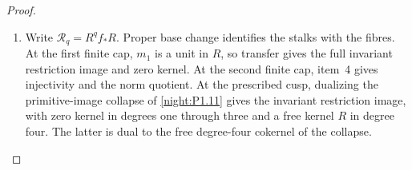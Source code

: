 \documentclass[11pt,a4paper]{article}
\numberwithin{equation}{section}
\theoremstyle{definition}
\begin{document}
\begin{proof}
\begin{enumerate}[label=\arabic*.]
of \cite[Lemma~7.25 and Propositions~7.26--7.27, pp.~61--63]{AC26}
and \cite[section ``The integral homology'']{E26}, with the
following explicitly computed coefficients.  Put
$L_q=\bigwedge^qR^6$, $A_q=\bigwedge^qA$, $B_q=\bigwedge^qB$.
The based-sphere complex for $j_*L_q$ is
\[
\begin{gathered}
 J_{1,q}\oplus J_{2,q}\oplus J_{0,q}
 \xrightarrow{d_0} L_q^2\xrightarrow{\Delta_q}L_q,\\
 J_{1,q}=\ker(A_q-I),\quad J_{2,q}=\ker(B_q-I),\quad
 J_{0,q}=\ker(B_qA_q-I),\\
 d_0(j_1,j_2,j_0)=(j_1-j_0,j_2-A_qj_0),\\
 \Delta_q(x,y)=(A_q-I)x+(B_q-I)y.
\end{gathered}
\]
The cusp paths carry $j_0$ and $A_qj_0$, so their combined
boundary is zero.  Inverse generator conventions give a chain
isomorphism: use cusp basis $A_qJ_{0,q}$ for the inverse pair,
and maps $-I$, $\operatorname{diag}(-A_q,-B_q)$, $I$ in degrees
zero, one and two.  Both chain identities follow by multiplication.

Unimodular HNF transformations give primitive invariant bases
and kernel coordinates for $d_0$ in $\ker\Delta_q$.  In both cases
the exact Smith records are
\[
\begin{array}{c|ccc|c|c}
q&\operatorname{rank}H^0&\operatorname{rank}H^1&\operatorname{rank}H^2
 &\operatorname{SNF}(d_0\text{ in }\ker\Delta_q)
 &\operatorname{SNF}(\Delta_q)\\\hline
1&1&0&0&1^6&1^5,2\\
2&0&0&0&1^{15}&1^{14},2\\
3&0&3&0&1^{17}&1^{19},2\\
4&0&0&0&1^{15}&1^{14},2
\end{array}
\]
All displayed groups are therefore free over $R$.

\item Write $\mathcal R_q=R^qf_*R$.  Proper base change
\cite[Tag~09V5, Lemma~20.18.1]{StacksProject} identifies the stalks
with the fibres.  At the first finite cap, $m_1$ is a
unit in $R$, so transfer gives the full invariant restriction
image and zero kernel.  At the second finite cap, item~4 gives
injectivity and the norm quotient.  At the prescribed cusp,
dualizing the primitive-image collapse of
\cref{night:P1.11} gives the invariant restriction image, with
zero kernel in degrees one through three and a free kernel $R$
in degree four.  The latter is dual to the free degree-four
cokernel of the collapse.


\end{enumerate}
\end{proof}
\end{document}
